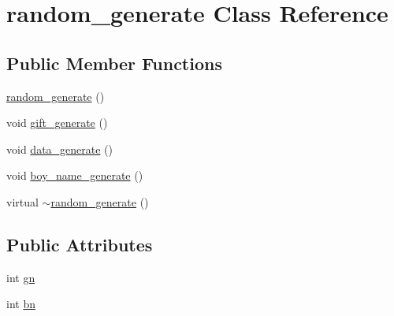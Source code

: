 \hypertarget{classrandom__generate}{\section{random\-\_\-generate Class Reference}
\label{classrandom__generate}
}
\subsection*{Public Member Functions}
\begin{DoxyCompactItemize}
\item 
\hyperlink{classrandom__generate_adf73bf74ae2c17bc6bc0056da8589d50}{random\-\_\-generate} ()
\item 
void \hyperlink{classrandom__generate_ac1a87e408acec686353c169a91e2a5f2}{gift\-\_\-generate} ()
\item 
void \hyperlink{classrandom__generate_adace64f7e5ad879cba3868661abd0ede}{data\-\_\-generate} ()
\item 
void \hyperlink{classrandom__generate_a35f8e2953f907b45e3ca233e1b0ec5a5}{boy\-\_\-name\-\_\-generate} ()
\item 
virtual \hyperlink{classrandom__generate_a7ce3a080b99678831c97d487c606900b}{$\sim$random\-\_\-generate} ()
\end{DoxyCompactItemize}
\subsection*{Public Attributes}
\begin{DoxyCompactItemize}
\item 
int \hyperlink{classrandom__generate_a51af0a6897932e60fd2fe8c318889e25}{gn}
\item 
int \hyperlink{classrandom__generate_a0947bf806ea49f4662873a8fc650576a}{bn}
\end{DoxyCompactItemize}


